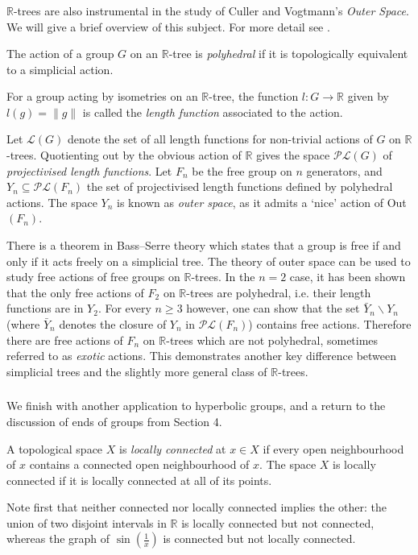 \subsubsection{}
$\mathbb{R}$-trees are also instrumental in the study of Culler and Vogtmann's \textit{Outer Space}. We will give a brief overview of this subject. For more detail see \cite[Section 2]{Shalen}.

\begin{definition}
    The action of a group $G$ on an $\mathbb{R}$-tree is \emph{polyhedral} if it is topologically equivalent to a simplicial action.
\end{definition}
\begin{definition}
    For a group acting by isometries on an $\mathbb{R}$-tree, the function $l:G\rightarrow\mathbb{R}$ given by $l(g)=\lVert g\rVert$ is called the \emph{length function} associated to the action.
\end{definition}

Let $\mathcal{L}(G)$ denote the set of all length functions for non-trivial actions of $G$ on $\mathbb{R}$-trees. Quotienting out by the obvious action of $\mathbb{R}$ gives the space $\mathcal{PL}(G)$ of \textit{projectivised length functions}. Let $F_n$ be the free group on $n$ generators, and $Y_n\subseteq \mathcal{PL}(F_n)$ the set of projectivised length functions defined by polyhedral actions. The space $Y_n$ is known as \textit{outer space}, as it admits a `nice' action of Out$(F_n)$. 

There is a theorem in Bass--Serre theory which states that a group is free if and only if it acts freely on a simplicial tree. The theory of outer space can be used to study free actions of free groups on $\mathbb{R}$-trees. In the $n=2$ case, it has been shown that the only free actions of $F_2$ on $\mathbb{R}$-trees are polyhedral, i.e. their length functions are in $Y_2$. For every $n\geq 3$ however, one can show that the set $\bar{Y}_n\backslash Y_n$ (where $\bar{Y}_n$ denotes the closure of $Y_n$ in $\mathcal{PL}(F_n)$) contains free actions. Therefore there are free actions of $F_n$ on $\mathbb{R}$-trees which are not polyhedral, sometimes referred to as \textit{exotic} actions. This demonstrates another key difference between simplicial trees and the slightly more general class of $\mathbb{R}$-trees.

\subsubsection{}
We finish with another application to hyperbolic groups, and a return to the discussion of ends of groups from Section 4.
\begin{definition}
    A topological space $X$ is \emph{locally connected} at $x\in X$ if every open neighbourhood of $x$ contains a connected open neighbourhood of $x$. The space $X$ is locally connected if it is locally connected at all of its points.
\end{definition}
Note first that neither connected nor locally connected implies the other: the union of two disjoint intervals in $\mathbb{R}$ is locally connected but not connected, whereas the graph of $\sin(\frac{1}{x})$ is connected but not locally connected.

